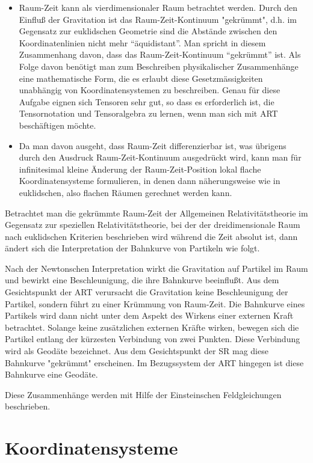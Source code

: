 \documentclass[11pt,a4paper]{article}
\begin{document}
\begin{itemize}
	\item Raum-Zeit kann als vierdimensionaler Raum betrachtet werden. Durch den Einfluß der Gravitation ist das Raum-Zeit-Kontinuum "gekrümmt", d.h. im Gegensatz zur euklidschen Geometrie sind die Abstände zwischen den Koordinatenlinien nicht mehr "`äquidistant"'. Man spricht in diesem Zusammenhang davon, dass das Raum-Zeit-Kontinuum "`gekrümmt"' ist. Als Folge davon benötigt man zum Beschreiben physikalischer Zusammenhänge eine mathematische Form, die es erlaubt diese Gesetzmässigkeiten unabhängig von Koordinatensystemen zu beschreiben. Genau für diese Aufgabe eignen sich Tensoren sehr gut, so dass es erforderlich ist, die Tensornotation und Tensoralgebra zu lernen, wenn man sich mit ART beschäftigen möchte.
	
	\item Da man davon ausgeht, dass Raum-Zeit differenzierbar ist, was übrigens durch den Ausdruck Raum-Zeit-Kontinuum ausgedrückt wird, kann man für infinitesimal kleine Änderung der Raum-Zeit-Position lokal flache Koordinatensysteme formulieren, in denen dann näherungsweise wie in euklidschen, also flachen Räumen gerechnet werden kann.
\end{itemize}

Betrachtet man die gekrümmte Raum-Zeit der Allgemeinen Relativitätstheorie im Gegensatz zur speziellen Relativitätstheorie, bei der der dreidimensionale Raum nach euklidschen Kriterien beschrieben wird während die Zeit absolut ist, dann ändert sich die Interpretation der Bahnkurve von Partikeln wie folgt.

Nach der Newtonschen Interpretation wirkt die Gravitation auf Partikel im Raum und bewirkt eine Beschleunigung, die ihre Bahnkurve beeinflußt. Aus dem Gesichtspunkt der ART verursacht die Gravitation keine Beschleunigung der Partikel, sondern führt zu einer Krümmung von Raum-Zeit. Die Bahnkurve eines Partikels wird dann nicht unter dem Aspekt des Wirkens einer externen Kraft betrachtet. Solange keine zusätzlichen externen Kräfte wirken, bewegen sich die Partikel entlang der kürzesten Verbindung von zwei Punkten. Diese Verbindung wird als Geodäte bezeichnet. Aus dem Gesichtspunkt der SR mag diese Bahnkurve "gekrümmt" erscheinen. Im Bezugssystem der ART hingegen ist diese Bahnkurve eine Geodäte. 

Diese Zusammenhänge werden mit Hilfe der Einsteinschen Feldgleichungen beschrieben.



\section{Koordinatensysteme}
\end{document}
